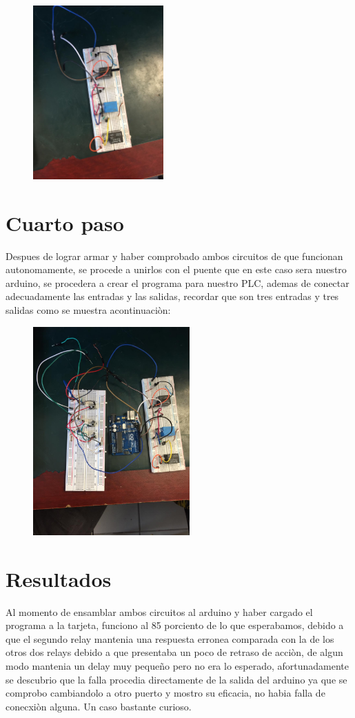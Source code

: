 \documentclass[12pt,a4paper]{article}
\begin{document}
\begin{figure}[h!]
\centering
\includegraphics[width=5cm]{segundaimagen.jpeg} 
\end{figure}

\section{Cuarto paso}
Despues de lograr armar y haber comprobado ambos circuitos de que funcionan autonomamente, se procede a unirlos con el puente que en este caso sera nuestro arduino, se procedera a crear el programa para nuestro PLC, ademas de conectar adecuadamente las entradas y las salidas, recordar que son tres entradas y tres salidas como se muestra acontinuaciòn:

\begin{figure}[h!]
\centering
\includegraphics[width=6cm]{terceraimagen.jpeg} 
\end{figure}

\section{Resultados}
Al momento de ensamblar ambos circuitos al arduino y haber cargado el programa a la tarjeta, funciono al 85 porciento de lo que esperabamos, debido a que el segundo relay mantenia una respuesta erronea comparada con la de los otros dos relays debido a que presentaba un poco de retraso de acciòn, de algun modo mantenia un delay muy pequeño pero no era lo esperado, afortunadamente se descubrio que la falla procedia directamente de la salida del arduino ya que se comprobo cambiandolo a otro puerto y mostro su eficacia, no habia falla de conecxiòn alguna. Un caso bastante curioso.
\end{document}
